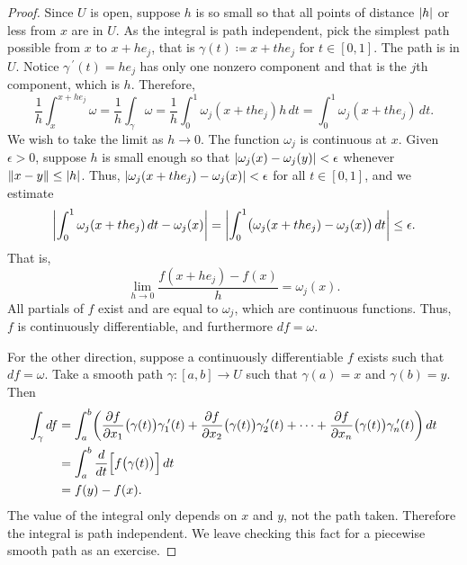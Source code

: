 \begin{proof}
Since $U$ is open, suppose $h$ is so small so that all points of distance
$\left\lvert {h} \right\rvert$ or
less from $x$ are in $U$.
As the integral is path independent,
pick the simplest path possible from $x$ to $x+he_j$, that is
$\gamma(t) \coloneqq x+t he_j$ for $t \in [0,1]$.  The path is in $U$.
Notice $\gamma^{\:\prime}(t) = h e_j$
has only one nonzero component and that is the $j$th component, which is
$h$.  Therefore,
\begin{equation*}
\frac{1}{h} \int_{x}^{x+he_j} \omega 
=
\frac{1}{h} \int_{\gamma} \omega 
=
\frac{1}{h} \int_0^1 \omega_j(x+the_j) h \, dt 
=
\int_0^1 \omega_j(x+the_j) \, dt  .
\end{equation*}
We wish to take the limit as $h \to 0$.  The function $\omega_j$ is
continuous at $x$.  Given $\epsilon > 0$, suppose $h$ is small enough so that
$\left\lvert {\omega_j(x)-\omega_j(y)} \right\rvert < \epsilon$ whenever $\lVert {x-y} \rVert \leq \left\lvert {h} \right\rvert$.
Thus,
$\left\lvert {\omega_j(x+the_j)-\omega_j(x)} \right\rvert < \epsilon$ for all $t \in [0,1]$,
and we estimate
\begin{equation*}
\left\lvert {\int_0^1 \omega_j(x+the_j) \, dt  - \omega_j(x)} \right\rvert
=
\left\lvert {\int_0^1 \bigl( \omega_j(x+the_j) - \omega_j(x) \bigr) \, dt} \right\rvert
\leq
\epsilon .
\end{equation*}
That is,
\begin{equation*}
\lim_{h\to 0}\frac{f(x+h e_j) - f(x)}{h} = \omega_j(x) .
\end{equation*}
All partials of $f$ exist and are equal to $\omega_j$, which are continuous
functions.  Thus, $f$ is continuously differentiable, and furthermore
$df = \omega$.

For the other direction,
suppose a continuously differentiable $f$ exists such that $df = \omega$.
Take a smooth
path
$\gamma \colon [a,b] \to U$ such that $\gamma(a) = x$ and
$\gamma(b) = y$.  Then
\begin{equation*}
\begin{split}
\int_\gamma df
& =
\int_a^b
\biggl(
\frac{\partial f}{\partial x_1}\bigl(\gamma(t)\bigr) \gamma_1^{\:\prime}(t)+
\frac{\partial f}{\partial x_2}\bigl(\gamma(t)\bigr) \gamma_2^{\:\prime}(t)+ \cdots +
\frac{\partial f}{\partial x_n}\bigl(\gamma(t)\bigr) \gamma_n^{\:\prime}(t)
\biggr) \, dt
\\
& = 
\int_a^b
\frac{d}{dt} \Bigl[ f\bigl(\gamma(t)\bigr) \Bigr]\, dt
\\
& = f(y)-f(x) .
\end{split}
\end{equation*}
The value of the integral only depends on $x$ and $y$, not the
path taken.  Therefore the integral is path independent.
We leave checking this fact for a piecewise smooth path as an exercise.
\end{proof}

